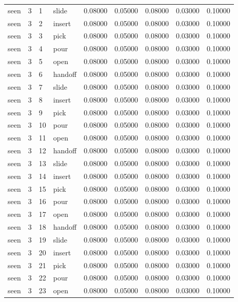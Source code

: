 \documentclass{article}
\begin{document}
\begin{center}
\begin{longtable}{lllllllll}
seen & 3 & 1 & slide & 0.08000 & 0.05000 & 0.08000 & 0.03000 & 0.10000 \\
seen & 3 & 2 & insert & 0.08000 & 0.05000 & 0.08000 & 0.03000 & 0.10000 \\
seen & 3 & 3 & pick & 0.08000 & 0.05000 & 0.08000 & 0.03000 & 0.10000 \\
seen & 3 & 4 & pour & 0.08000 & 0.05000 & 0.08000 & 0.03000 & 0.10000 \\
seen & 3 & 5 & open & 0.08000 & 0.05000 & 0.08000 & 0.03000 & 0.10000 \\
seen & 3 & 6 & handoff & 0.08000 & 0.05000 & 0.08000 & 0.03000 & 0.10000 \\
seen & 3 & 7 & slide & 0.08000 & 0.05000 & 0.08000 & 0.03000 & 0.10000 \\
seen & 3 & 8 & insert & 0.08000 & 0.05000 & 0.08000 & 0.03000 & 0.10000 \\
seen & 3 & 9 & pick & 0.08000 & 0.05000 & 0.08000 & 0.03000 & 0.10000 \\
seen & 3 & 10 & pour & 0.08000 & 0.05000 & 0.08000 & 0.03000 & 0.10000 \\
seen & 3 & 11 & open & 0.08000 & 0.05000 & 0.08000 & 0.03000 & 0.10000 \\
seen & 3 & 12 & handoff & 0.08000 & 0.05000 & 0.08000 & 0.03000 & 0.10000 \\
seen & 3 & 13 & slide & 0.08000 & 0.05000 & 0.08000 & 0.03000 & 0.10000 \\
seen & 3 & 14 & insert & 0.08000 & 0.05000 & 0.08000 & 0.03000 & 0.10000 \\
seen & 3 & 15 & pick & 0.08000 & 0.05000 & 0.08000 & 0.03000 & 0.10000 \\
seen & 3 & 16 & pour & 0.08000 & 0.05000 & 0.08000 & 0.03000 & 0.10000 \\
seen & 3 & 17 & open & 0.08000 & 0.05000 & 0.08000 & 0.03000 & 0.10000 \\
seen & 3 & 18 & handoff & 0.08000 & 0.05000 & 0.08000 & 0.03000 & 0.10000 \\
seen & 3 & 19 & slide & 0.08000 & 0.05000 & 0.08000 & 0.03000 & 0.10000 \\
seen & 3 & 20 & insert & 0.08000 & 0.05000 & 0.08000 & 0.03000 & 0.10000 \\
seen & 3 & 21 & pick & 0.08000 & 0.05000 & 0.08000 & 0.03000 & 0.10000 \\
seen & 3 & 22 & pour & 0.08000 & 0.05000 & 0.08000 & 0.03000 & 0.10000 \\
seen & 3 & 23 & open & 0.08000 & 0.05000 & 0.08000 & 0.03000 & 0.10000 \\

\end{longtable}
\end{center}
\end{document}
